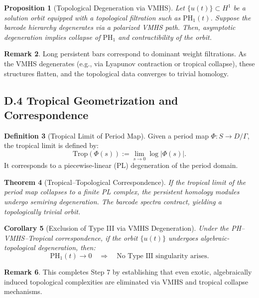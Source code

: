 \documentclass[11pt]{article}
\newtheorem{theorem}{Theorem}[section]
\newtheorem{proposition}[theorem]{Proposition}
\newtheorem{corollary}[theorem]{Corollary}
\theoremstyle{definition}
\newtheorem{definition}[theorem]{Definition}
\newtheorem{remark}[theorem]{Remark}
\begin{document}
\begin{proposition}[Topological Degeneration via VMHS]
Let \( \{ u(t) \} \subset H^1 \) be a solution orbit equipped with a topological filtration such as \( \mathrm{PH}_1(t) \). Suppose the barcode hierarchy degenerates via a polarized VMHS path. Then, asymptotic degeneration implies collapse of \( \mathrm{PH}_1 \) and contractibility of the orbit.
\end{proposition}

\begin{remark}
Long persistent bars correspond to dominant weight filtrations. As the VMHS degenerates (e.g., via Lyapunov contraction or tropical collapse), these structures flatten, and the topological data converges to trivial homology.
\end{remark}

\subsection*{D.4 Tropical Geometrization and Correspondence}

\begin{definition}[Tropical Limit of Period Map]
Given a period map \( \Phi: S \to D/\Gamma \), the tropical limit is defined by:
\[
\mathrm{Trop}(\Phi(s)) := \lim_{s \to 0} \log |\Phi(s)|.
\]
It corresponds to a piecewise-linear (PL) degeneration of the period domain.
\end{definition}

\begin{theorem}[Tropical–Topological Correspondence]
If the tropical limit of the period map collapses to a finite PL complex, the persistent homology modules undergo semiring degeneration. The barcode spectra contract, yielding a topologically trivial orbit.
\end{theorem}

\begin{corollary}[Exclusion of Type III via VMHS Degeneration]
Under the PH–VMHS–Tropical correspondence, if the orbit \( \{ u(t) \} \) undergoes algebraic-topological degeneration, then:
\[
\mathrm{PH}_1(t) \to 0 \quad \Rightarrow \quad \text{No Type III singularity arises.}
\]
\end{corollary}

\begin{remark}
This completes Step 7 by establishing that even exotic, algebraically induced topological complexities are eliminated via VMHS and tropical collapse mechanisms.
\end{remark}
\end{document}
